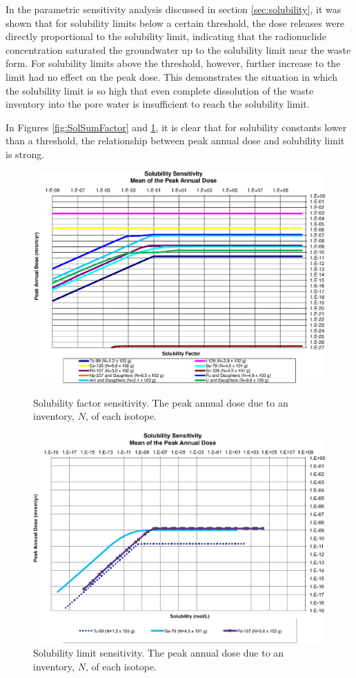 In the parametric sensitivity analysis discussed in section 
\ref{sec:solubility}, it was shown that for solubility limits below a certain 
threshold, the dose releases were directly proportional to the solubility 
limit, indicating that the radionuclide concentration saturated the groundwater 
up to the solubility limit near the waste form.  For solubility limits above 
the threshold, however, further increase to the limit had no effect on the peak 
dose. This demonstrates the situation in which the solubility limit is so high 
that even complete dissolution of the waste inventory into the pore water is 
insufficient to reach the solubility limit.

In Figures \ref{fig:SolSumFactor} and \ref{fig:SolSum}, it is clear that for 
solubility constants lower than a threshold, the relationship between peak 
annual dose and solubility limit is strong.

\begin{figure}[ht]
\centering
\includegraphics[width=0.7\linewidth]{./chapters/nuclide_sensitivity/clay/Solubility/Solubility_Summary_SolFactor.eps}
\caption{Solubility factor sensitivity. The peak annual dose due to an inventory, 
$N$, of each isotope.}
\label{fig:SolSumFactor}

\includegraphics[width=0.7\linewidth]{./chapters/nuclide_sensitivity/clay/Solubility/Solubility_Summary_Sol.eps}
\caption{Solubility limit sensitivity. The peak annual dose due to an inventory, 
$N$, of each isotope.}
\label{fig:SolSum}
\end{figure}
\FloatBarrier
